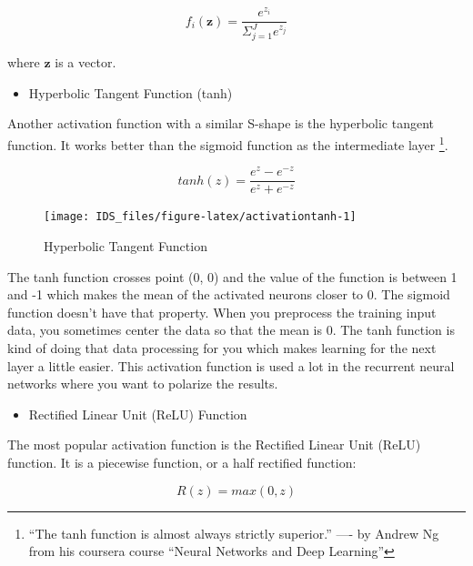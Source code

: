 \documentclass[12pt,]{krantz}
\providecommand{\tightlist}{%
  \setlength{\itemsep}{0pt}\setlength{\parskip}{0pt}}
\begin{document}
\begin{equation}
f_i(\mathbf{z}) = \frac{e^{z_i}}{\Sigma_{j=1}^{J} e^{z_j} }
\label{eq:softmax}
\end{equation}

where \(\mathbf{z}\) is a vector.

\begin{itemize}
\tightlist
\item
  Hyperbolic Tangent Function (tanh)
\end{itemize}

Another activation function with a similar S-shape is the hyperbolic tangent function. It works better than the sigmoid function as the intermediate layer \footnote{``The tanh function is almost always strictly superior.'' ---- by Andrew Ng from his coursera course ``Neural Networks and Deep Learning''}.

\begin{equation}
tanh(z) = \frac{e^{z} - e^{-z}}{e^{z} + e^{-z}}
\label{eq:tanh}
\end{equation}

\begin{figure}

{\centering \texttt{[image: IDS\_files/figure-latex/activationtanh-1]} 

}

\caption{Hyperbolic Tangent Function}\label{fig:activationtanh}
\end{figure}

The tanh function crosses point (0, 0) and the value of the function is between 1 and -1 which makes the mean of the activated neurons closer to 0. The sigmoid function doesn't have that property. When you preprocess the training input data, you sometimes center the data so that the mean is 0. The tanh function is kind of doing that data processing for you which makes learning for the next layer a little easier. This activation function is used a lot in the recurrent neural networks where you want to polarize the results.

\begin{itemize}
\tightlist
\item
  Rectified Linear Unit (ReLU) Function
\end{itemize}

The most popular activation function is the Rectified Linear Unit (ReLU) function. It is a piecewise function, or a half rectified function:

\begin{equation}
R(z) = max(0, z)
\label{eq:relu}
\end{equation}
\end{document}
